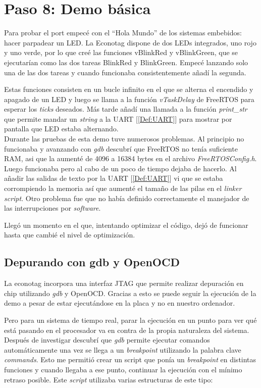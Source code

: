 \section{Paso 8: Demo básica}
Para probar el port empecé con el ``Hola Mundo'' de los sistemas embebidos: hacer parpadear un LED. La Econotag dispone de dos LEDs integrados, uno rojo y uno verde, por lo que creé las funciones vBlinkRed y vBlinkGreen, que se ejecutarían como las dos tareas BlinkRed y BlinkGreen. Empecé lanzando solo una de las dos tareas y cuando funcionaba consistentemente añadí la segunda.

Estas funciones consisten en un bucle infinito en el que se alterna el encendido y apagado de un LED y luego se llama a la función \emph{vTaskDelay} de FreeRTOS para esperar los \emph{ticks} deseados. Más tarde añadí una llamada a la función \emph{print\_str} que permite mandar un \emph{string} a la UART [\ref{Def:UART}] para mostrar por pantalla que LED estaba alternando.\\


Durante las pruebas de esta demo tuve numerosos problemas. Al principio no funcionaba y avanzando con \emph{gdb} descubrí que FreeRTOS no tenía suficiente RAM, asi que la aumenté de 4096 a 16384 bytes en el archivo \emph{FreeRTOSConfig.h}. Luego funcionaba pero al cabo de un poco de tiempo dejaba de hacerlo. Al añadir las salidas de texto por la UART [\ref{Def:UART}] vi que se estaba corrompiendo la memoria así que aumenté el tamaño de las pilas en el \emph{linker script}. Otro problema fue que no había definido correctamente el manejador de las interrupciones por \emph{software}.

Llegó un momento en el que, intentando optimizar el código, dejó de funcionar hasta que cambié el nivel de optimización.

\subsection{Depurando con gdb y OpenOCD}
La econotag incorpora una interfaz JTAG que permite realizar depuración en chip utilizando \emph{gdb} y OpenOCD. Gracias a esto se puede seguir la ejecución de la demo a pesar de estar ejecutándose en la placa y no en nuestro ordenador.

Pero para un sistema de tiempo real, parar la ejecución en un punto para ver qué está pasando en el procesador va en contra de la propia naturaleza del sistema. Después de investigar descubrí que \emph{gdb} permite ejecutar comandos automáticamente una vez se llega a un \emph{breakpoint} utilizando la palabra clave \emph{commands}. Esto me permitió crear un script que ponía un \emph{breakpoint} en distintas funciones y cuando llegaba a ese punto, continuar la ejecución con el mínimo retraso posible. Este \emph{script} utilizaba varias estructuras de este tipo:

